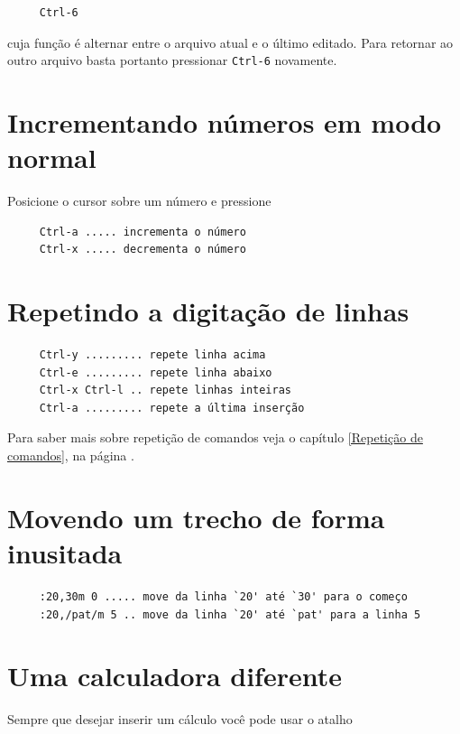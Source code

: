 \documentclass[10pt,a4paper,openany]{book}
\begin{document}
\begin{verbatim}
     Ctrl-6
\end{verbatim}

cuja função é alternar entre o arquivo atual e o último editado. Para retornar
ao outro arquivo basta portanto pressionar \verb|Ctrl-6| novamente.

\section{Incrementando números em modo normal}\label{Incrementando números em modo normal}
Posicione o cursor sobre um número e pressione

\begin{verbatim}
     Ctrl-a ..... incrementa o número
     Ctrl-x ..... decrementa o número
\end{verbatim}

\section{Repetindo a digitação de linhas}
\label{Repetindo a digitação de linhas}

\begin{verbatim}
     Ctrl-y ......... repete linha acima
     Ctrl-e ......... repete linha abaixo
     Ctrl-x Ctrl-l .. repete linhas inteiras
     Ctrl-a ......... repete a última inserção
\end{verbatim}

Para saber mais sobre repetição de comandos veja o capítulo \ref{Repetição de comandos},
na página \pageref{Repetição de comandos}.

\section{Movendo um trecho de forma inusitada}
\label{Movendo um trecho de forma inusitada}

\begin{verbatim}
     :20,30m 0 ..... move da linha `20' até `30' para o começo
     :20,/pat/m 5 .. move da linha `20' até `pat' para a linha 5
\end{verbatim}


\section{Uma calculadora diferente}
\label{Uma calculadora diferente}
Sempre que desejar inserir um cálculo você pode usar o atalho
\end{document}
